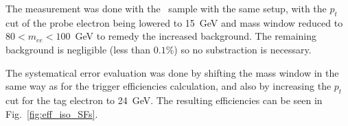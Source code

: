 The measurement was done with the \Zee\ sample with the same setup, with the $p_{t}$ cut of the probe electron being lowered to 15~GeV and mass window reduced to $80 < m_{ee} < 100$~GeV to remedy the increased background. The remaining background is negligible (less than $0.1$\%) so no substraction is necessary.

The systematical error evaluation was done by shifting the mass window in the same way as for the trigger efficiencies calculation, and also by increasing the $p_{t}$ cut for the tag electron to 24~GeV. The resulting efficiencies can be seen in Fig.~\ref{fig:eff_iso_SFs}.

\begin{figure}
\end{figure}
